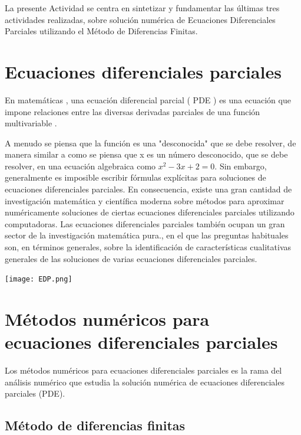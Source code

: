 \documentclass[12pt]{article}
\begin{document}
La presente Actividad se centra en sintetizar y fundamentar las últimas tres actividades realizadas, sobre solución numérica de Ecuaciones Diferenciales Parciales utilizando el Método de Diferencias Finitas.




\section{Ecuaciones diferenciales parciales}

En matemáticas , una ecuación diferencial parcial ( PDE ) es una ecuación que impone relaciones entre las diversas derivadas parciales de una función multivariable .

A menudo se piensa que la función es una "desconocida" que se debe resolver, de manera similar a como se piensa que x es un número desconocido, que se debe resolver, en una ecuación algebraica como $x^{2} - 3x + 2 = 0$. Sin embargo, generalmente es imposible escribir fórmulas explícitas para soluciones de ecuaciones diferenciales parciales. En consecuencia, existe una gran cantidad de investigación matemática y científica moderna sobre métodos para aproximar numéricamente soluciones de ciertas ecuaciones diferenciales parciales utilizando computadoras. Las ecuaciones diferenciales parciales también ocupan un gran sector de la investigación matemática pura., en el que las preguntas habituales son, en términos generales, sobre la identificación de características cualitativas generales de las soluciones de varias ecuaciones diferenciales parciales.

\begin{center}
    \texttt{[image: EDP.png]}
\end{center}




\section{Métodos numéricos para ecuaciones diferenciales parciales}

Los métodos numéricos para ecuaciones diferenciales parciales es la rama del análisis numérico que estudia la solución numérica de ecuaciones diferenciales parciales (PDE).

    \subsection{Método de diferencias finitas}
    
\end{document}
